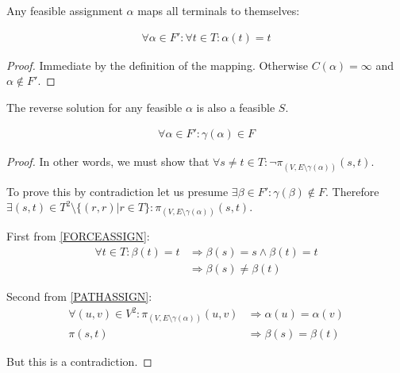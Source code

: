 \documentclass{article}
\begin{document}
\begin{lemma}
\label{FORCEASSIGN}
Any feasible assignment $\alpha$ maps all terminals to themselves:

\begin{align}
	\nonumber \forall \alpha \in F' : \forall t \in T : \alpha(t) = t
\end{align}
\end{lemma}
\begin{proof}
Immediate by the definition of the mapping.
Otherwise $C(\alpha) = \infty$ and $\alpha \not\in F'$.
\end{proof}

\begin{lemma}
\label{REVERSEFEASABLE}
The reverse solution for any feasible $\alpha$ is also a feasible $S$.

\begin{align}
	\nonumber \forall \alpha \in F' : \gamma(\alpha) \in F
\end{align}
\end{lemma}
\begin{proof}
In other words, we must show that $\forall s \neq t \in T : \neg\pi_{(V, E \setminus \gamma(\alpha))}(s, t)$.

To prove this by contradiction let us presume $\exists \beta \in F' : \gamma(\beta) \not\in F$.
Therefore $\exists (s, t) \in T^2 \setminus \{(r,r) | r \in T\} : \pi_{(V, E \setminus \gamma(\alpha))}(s, t)$.

First from \ref{FORCEASSIGN}:
\begin{align}
	\nonumber \forall t \in T : \beta(t) = t & \Rightarrow \beta(s) = s \wedge \beta(t) = t \\
	\nonumber & \Rightarrow \beta(s) \neq \beta(t)
\end{align}

Second from \ref{PATHASSIGN}:
\begin{align}
	\nonumber \forall (u, v) \in V^2 : \pi_{(V, E \setminus \gamma(\alpha))}(u,v) & \Rightarrow \alpha(u) = \alpha(v) \\
	\nonumber \pi(s, t) & \Rightarrow \beta(s) = \beta(t)
\end{align}

But this is a contradiction.
\end{proof}

%
\end{document}
